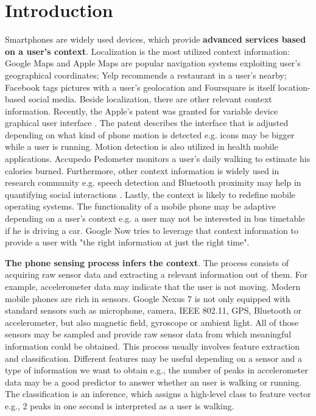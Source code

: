 \section{Introduction}
\label{s:intro}
\hspace{10pt} Smartphones are widely used devices, which provide \textbf{advanced services based on a user's context}. Localization is the most utilized context information: Google Maps \cite{google:maps} and Apple Maps \cite{apple:maps} are popular navigation systems exploiting user's geographical coordinates; Yelp \cite{yelp:yelp} recommends a restaurant in a user's nearby; Facebook \cite{facebook:facebook} tags pictures with a user's geolocation and Foursquare \cite{foursquare:foursquare} is itself location-based social media. Beside localization, there are other relevant context information. Recently, the Apple's patent was granted for variable device graphical user interface \cite{uspatent:apple}. The patent describes the interface that is adjusted depending on what kind of phone motion is detected e.g. icons may be bigger while a user is running. Motion detection is also utilized in health mobile applications. Accupedo Pedometer \cite{googleplay:accupedo} monitors a user's daily walking to estimate his calories burned. Furthermore, other context information is widely used in research community e.g. speech detection and Bluetooth proximity may help in quantifying social interactions \cite{rachuri:socialsense}. Lastly, the context is likely to redefine mobile operating systems. The functionality of a mobile phone may be adaptive depending on a user's context e.g. a user may not be interested in bus timetable if he is driving a car. Google Now \cite{google:googlenow} tries to leverage that context information to provide a user with "the right information at just the right time".

\textbf{The phone sensing process infers the context}. The process consists of acquiring raw sensor data and extracting a relevant information out of them. For example, accelerometer data may indicate that the user is not moving. Modern mobile phones are rich in sensors. Google Nexus 7 is not only equipped with standard sensors such as microphone, camera, IEEE 802.11, GPS, Bluetooth or accelerometer, but also magnetic field, gyroscope or ambient light. All of those sensors may be sampled and provide raw sensor data from which meaningful information could be obtained. This process usually involves feature extraction and classification. Different features may be useful depending on a sensor and a type of information we want to obtain e.g., the number of peaks in accelerometer data may be a good predictor to answer whether an user is walking or running. The classification is an inference, which assigns a high-level class to feature vector e.g., 2 peaks in one second is interpreted as a user is walking.

